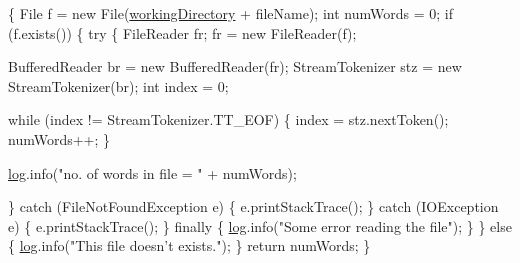 \begin{DoxyCode}
                                                  \{
        File f = \textcolor{keyword}{new} File(\hyperlink{classcom_1_1poly_1_1nlp_1_1filekommander_1_1file_1_1actions_1_1_file_action_utils_ad54a8fdc9145d2f423c54cb1597f874a}{workingDirectory} + fileName);
        \textcolor{keywordtype}{int} numWords = 0;
        \textcolor{keywordflow}{if} (f.exists()) \{
            \textcolor{keywordflow}{try} \{
                FileReader fr;
                fr = \textcolor{keyword}{new} FileReader(f);

                BufferedReader br = \textcolor{keyword}{new} BufferedReader(fr);
                StreamTokenizer stz = \textcolor{keyword}{new} StreamTokenizer(br);
                \textcolor{keywordtype}{int} index = 0;

                \textcolor{keywordflow}{while} (index != StreamTokenizer.TT\_EOF) \{
                    index = stz.nextToken();
                    numWords++;
                \}

                \hyperlink{classcom_1_1poly_1_1nlp_1_1filekommander_1_1file_1_1actions_1_1_file_action_utils_a7af6d26171248a2e7253d9bce1b287cc}{log}.info(\textcolor{stringliteral}{"no. of words in file = "} + numWords);

            \} \textcolor{keywordflow}{catch} (FileNotFoundException e) \{
                e.printStackTrace();
            \} \textcolor{keywordflow}{catch} (IOException e) \{
                e.printStackTrace();
            \} \textcolor{keywordflow}{finally} \{
                \hyperlink{classcom_1_1poly_1_1nlp_1_1filekommander_1_1file_1_1actions_1_1_file_action_utils_a7af6d26171248a2e7253d9bce1b287cc}{log}.info(\textcolor{stringliteral}{"Some error reading the file"});
            \}
        \} \textcolor{keywordflow}{else} \{
            \hyperlink{classcom_1_1poly_1_1nlp_1_1filekommander_1_1file_1_1actions_1_1_file_action_utils_a7af6d26171248a2e7253d9bce1b287cc}{log}.info(\textcolor{stringliteral}{"This file doesn't exists."});
        \}
        \textcolor{keywordflow}{return} numWords;
    \}
\end{DoxyCode}

